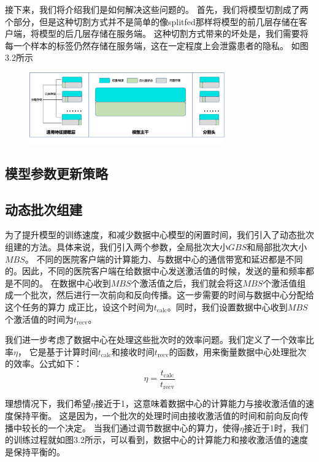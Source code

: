 接下来，我们将介绍我们是如何解决这些问题的。
首先，我们将模型切割成了两个部分，但是这种切割方式并不是简单的像splitfed那样将模型的前几层存储在客户端，将模型的后几层存储在服务端。
这种切割方式带来的坏处是，我们需要将每一个样本的标签仍然存储在服务端，这在一定程度上会泄露患者的隐私。
如图3.2所示

\begin{figure}
    \centering
    \includegraphics[width=0.75\textwidth]{figures/model_patition_method.png}
    \label{fig:diagram}
\end{figure}


\subsection{模型参数更新策略}



\subsection{动态批次组建}
为了提升模型的训练速度，和减少数据中心模型的闲置时间，我们引入了动态批次组建的方法。具体来说，我们引入两个参数，全局批次大小$GBS$和局部批次大小$MBS$。
不同的医院客户端的计算能力、与数据中心的通信带宽和延迟都是不同的。因此，不同的医院客户端在给数据中心发送激活值的时候，发送的量和频率都是不同的。
在数据中心收到$MBS$个激活值之后，我们就会将这$MBS$个激活值组成一个批次，然后进行一次前向和反向传播。这一步需要的时间与数据中心分配给这个任务的算力
成正比，设这个时间为$t_{\text{calc}}$。同时，我们设置数据中心收到$MBS$个激活值的时间为$t_{\text{recv}}$。

我们进一步考虑了数据中心在处理这些批次时的效率问题。我们定义了一个效率比率$\eta$，
它是基于计算时间$t_{\text{calc}}$和接收时间$t_{\text{recv}}$的函数，用来衡量数据中心处理批次的效率。公式如下：
\begin{equation}
    \eta = \frac{t_{\text{calc}}}{t_{\text{recv}}}
\end{equation}

理想情况下，我们希望$\eta$接近于1，这意味着数据中心的计算能力与接收激活值的速度保持平衡。
这是因为，一个批次的处理时间由接收激活值的时间和前向反向传播中较长的一个决定。
当我们通过调节数据中心的算力，使得$\eta$接近于1时，我们的训练过程就如图3.2所示，可以看到，数据中心的计算能力和接收激活值的速度是保持平衡的。

